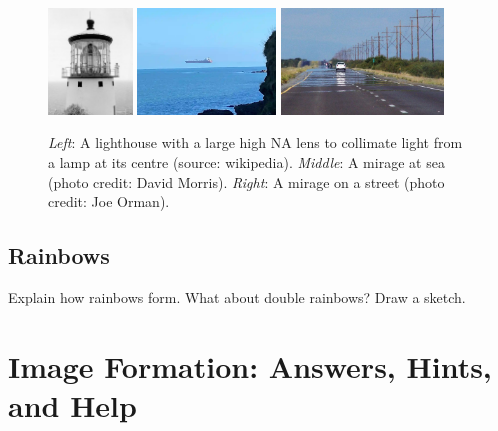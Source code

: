 \documentclass[a4paper]{report}
\begin{document}
	\begin{figure}[h]
		\center
		\includegraphics[width=0.2\textwidth]{figures/lighthouse.png}
		\includegraphics[width=0.327\textwidth]{figures/superior_mirage.png}
		\includegraphics[width=0.385\textwidth]{figures/mirage.png}
		\captionsetup{width=0.93\textwidth}
		\caption{\emph{Left}: A lighthouse with a large high NA lens to collimate light from a lamp at its centre (source: wikipedia). 
		\emph{Middle}: A mirage at sea (photo credit: David Morris).
		\emph{Right}: A mirage on a street (photo credit: Joe Orman).}
		\label{fig:lighthouse_mirage}
	\end{figure}
	
	
    \subsection{Rainbows}
    Explain how rainbows form. What about double rainbows? Draw a sketch.
	
	
	\clearpage
	
	
	\section{Image Formation: Answers, Hints, and Help}
	
\end{document}

